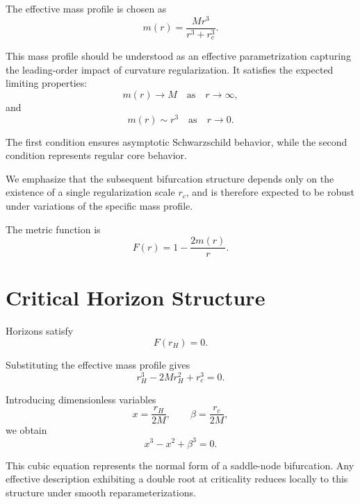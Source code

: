 \documentclass[11pt,a4paper]{article}
\begin{document}
The effective mass profile is chosen as
\begin{equation}
m(r) =
\frac{M r^3}{r^3 + r_c^3}.
\end{equation}

This mass profile should be understood as an effective parametrization capturing the leading-order impact of curvature regularization. It satisfies the expected limiting properties:
\begin{equation}
m(r) \to M
\quad
\text{as}
\quad
r \to \infty ,
\end{equation}
and
\begin{equation}
m(r) \sim r^3
\quad
\text{as}
\quad
r \to 0 .
\end{equation}

The first condition ensures asymptotic Schwarzschild behavior, while the second condition represents regular core behavior.

We emphasize that the subsequent bifurcation structure depends only on the existence of a single regularization scale $r_c$, and is therefore expected to be robust under variations of the specific mass profile.

The metric function is
\begin{equation}
F(r) =
1 - \frac{2m(r)}{r}.
\end{equation}

\section{Critical Horizon Structure}

Horizons satisfy
\begin{equation}
F(r_H) = 0 .
\end{equation}

Substituting the effective mass profile gives
\begin{equation}
r_H^3 - 2M r_H^2 + r_c^3 = 0 .
\end{equation}

Introducing dimensionless variables
\begin{equation}
x = \frac{r_H}{2M},
\qquad
\beta = \frac{r_c}{2M},
\end{equation}
we obtain
\begin{equation}
x^3 - x^2 + \beta^3 = 0 .
\end{equation}

This cubic equation represents the normal form of a saddle-node bifurcation. Any effective description exhibiting a double root at criticality reduces locally to this structure under smooth reparameterizations.
\end{document}
